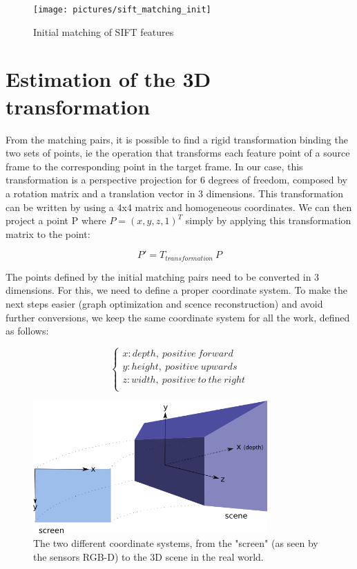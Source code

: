 \begin{figure}[H]
\centering
\texttt{[image: pictures/sift\_matching\_init]}
\caption{Initial matching of SIFT features}
\end{figure}

\section{Estimation of the 3D transformation}

From the matching pairs, it is possible to find a rigid transformation binding the two sets of points, ie the operation that transforms each feature point of a source frame to the corresponding point in the target frame. In our case, this transformation is a perspective projection for 6 degrees of freedom, composed by a rotation matrix and a translation vector in 3 dimensions. This transformation can be written by using a 4x4  matrix and homogeneous coordinates. We can then project a point P where $P = (x,y,z,1)^T$ simply by applying this transformation matrix to the point:

\[
P' = T_{transformation} \: P
\]

The points defined by the initial matching pairs need to be converted in 3 dimensions. For this, we need to define a proper coordinate system. To make the next steps easier (graph optimization and scence reconstruction) and avoid further conversions, we keep the same coordinate system for all the work, defined as follows:

\[
\left\{\begin{array}{l}
x: depth,\:positive\:forward\\
y: height,\:positive\:upwards\\
z: width,\:positive\:to\:the\:right\\
\end{array}
\right.
\]

\begin{figure}[H]
\centering
\includegraphics[width=0.8\textwidth]{figures/coordinates}
\caption{The two different coordinate systems, from the "screen" (as seen by the sensors RGB-D) to the 3D scene in the real world.}
\end{figure}

